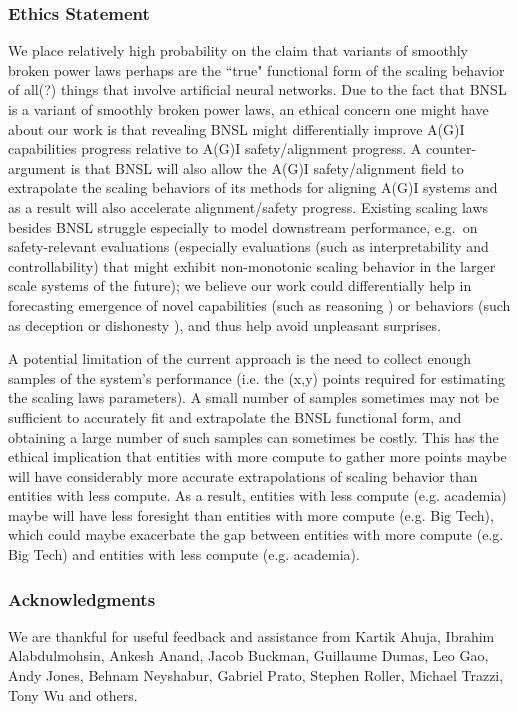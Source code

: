 \documentclass{article} %
\begin{document}
\clearpage

\subsubsection*{Ethics Statement}
We place relatively high probability on the claim that variants of smoothly broken power laws perhaps are the ``true" functional form of the scaling behavior of all(?) things that involve artificial neural networks. Due to the fact that BNSL is a variant of smoothly broken power laws, an ethical concern one might have about our work is that revealing BNSL might differentially \citep{hendrycks2022x} improve A(G)I capabilities progress relative to A(G)I safety/alignment progress. 
A counter-argument is that BNSL will also allow the A(G)I safety/alignment field to extrapolate the scaling behaviors of its methods for aligning A(G)I systems and as a result will also accelerate alignment/safety progress.
Existing scaling laws besides BNSL struggle especially to model downstream performance, e.g.\ on safety-relevant evaluations (especially evaluations (such as interpretability and controllability) that might exhibit non-monotonic scaling behavior in the larger scale systems of the future); we believe our work could differentially help in forecasting emergence of novel capabilities (such as reasoning \citep{wei2022chain}) or behaviors (such as deception or dishonesty \citep{evans2021truthful,lin2021truthfulqa}), and thus help avoid unpleasant surprises.

A potential limitation of the current approach is the need to collect enough samples of the system’s performance (i.e. the (x,y) points required for estimating the scaling laws parameters). A small number of samples sometimes may not be sufficient to accurately fit and extrapolate the BNSL functional form, and obtaining a large number of such samples can sometimes be costly. This has the ethical implication that entities with more compute to gather more points maybe will have considerably more accurate extrapolations of scaling behavior than entities with less compute. As a result, entities with less compute (e.g. academia) maybe will have less foresight than entities with more compute (e.g. Big Tech), which could maybe exacerbate the gap between entities with more compute (e.g. Big Tech) and entities with less compute (e.g. academia).

\subsubsection*{Acknowledgments}
We are thankful for useful feedback and assistance from Kartik Ahuja, Ibrahim Alabdulmohsin, Ankesh Anand, Jacob Buckman, Guillaume Dumas, Leo Gao, Andy Jones, Behnam Neyshabur, Gabriel Prato, Stephen Roller, Michael Trazzi, Tony Wu and others.
\end{document}
